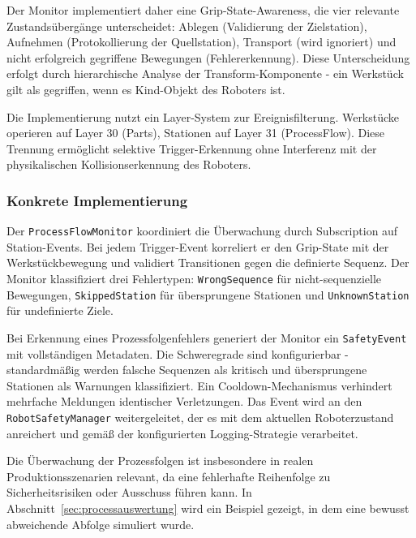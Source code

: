 Der Monitor implementiert daher eine Grip-State-Awareness, die vier
relevante Zustandsübergänge unterscheidet: Ablegen (Validierung der
Zielstation),
Aufnehmen (Protokollierung der Quellstation), Transport (wird ignoriert) und
nicht erfolgreich gegriffene Bewegungen (Fehlererkennung). Diese
Unterscheidung erfolgt durch
hierarchische Analyse der Transform-Komponente - ein Werkstück gilt als
gegriffen, wenn es Kind-Objekt des Roboters ist.

Die Implementierung nutzt ein Layer-System zur Ereignisfilterung. Werkstücke
operieren auf Layer 30 (Parts), Stationen auf Layer 31 (ProcessFlow). Diese
Trennung ermöglicht selektive Trigger-Erkennung ohne Interferenz mit der
physikalischen Kollisionserkennung des Roboters.

\subsubsection{Konkrete Implementierung}
Der \texttt{ProcessFlowMonitor} koordiniert die Überwachung durch Subscription
auf Station-Events. Bei jedem Trigger-Event korreliert er den Grip-State mit
der Werkstückbewegung und validiert Transitionen gegen die definierte Sequenz.
Der Monitor klassifiziert drei Fehlertypen: \texttt{WrongSequence} für
nicht-sequenzielle Bewegungen, \texttt{SkippedStation} für übersprungene
Stationen und \texttt{UnknownStation} für undefinierte Ziele.

Bei Erkennung eines Prozessfolgenfehlers generiert der Monitor ein
\texttt{SafetyEvent} mit
vollständigen Metadaten. Die Schweregrade sind konfigurierbar - standardmäßig
werden falsche Sequenzen als kritisch und übersprungene Stationen als Warnungen
klassifiziert. Ein Cooldown-Mechanismus verhindert mehrfache Meldungen
identischer Verletzungen. Das Event wird an den \texttt{RobotSafetyManager}
weitergeleitet, der es mit dem aktuellen Roboterzustand anreichert und gemäß
der konfigurierten Logging-Strategie verarbeitet.

Die Überwachung der Prozessfolgen ist insbesondere in realen
Produktionsszenarien relevant, da eine fehlerhafte Reihenfolge
zu Sicherheitsrisiken oder Ausschuss führen kann.
In Abschnitt~\ref{sec:processauswertung} wird ein Beispiel gezeigt, in
dem eine bewusst abweichende Abfolge simuliert wurde.
